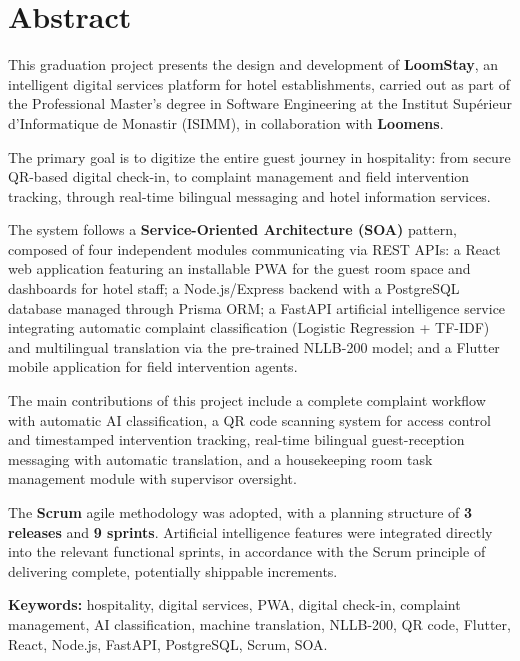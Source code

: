 
\chapter*{Abstract}

This graduation project presents the design and development of \textbf{LoomStay}, an intelligent digital services platform for hotel establishments, carried out as part of the Professional Master's degree in Software Engineering at the Institut Supérieur d'Informatique de Monastir (ISIMM), in collaboration with \textbf{Loomens}.

The primary goal is to digitize the entire guest journey in hospitality: from secure QR-based digital check-in, to complaint management and field intervention tracking, through real-time bilingual messaging and hotel information services.

The system follows a \textbf{Service-Oriented Architecture (SOA)} pattern, composed of four independent modules communicating via REST APIs: a React web application featuring an installable PWA for the guest room space and dashboards for hotel staff; a Node.js/Express backend with a PostgreSQL database managed through Prisma ORM; a FastAPI artificial intelligence service integrating automatic complaint classification (Logistic Regression + TF-IDF) and multilingual translation via the pre-trained NLLB-200 model; and a Flutter mobile application for field intervention agents.

The main contributions of this project include a complete complaint workflow with automatic AI classification, a QR code scanning system for access control and timestamped intervention tracking, real-time bilingual guest-reception messaging with automatic translation, and a housekeeping room task management module with supervisor oversight.

The \textbf{Scrum} agile methodology was adopted, with a planning structure of \textbf{3 releases} and \textbf{9 sprints}. Artificial intelligence features were integrated directly into the relevant functional sprints, in accordance with the Scrum principle of delivering complete, potentially shippable increments.

\vspace{0.5cm}
\textbf{Keywords:} hospitality, digital services, PWA, digital check-in, complaint management, AI classification, machine translation, NLLB-200, QR code, Flutter, React, Node.js, FastAPI, PostgreSQL, Scrum, SOA.

\newpage
